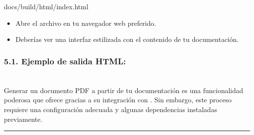 \documentclass[a4paper,10pt,oneside,spanish,openany]{sphinxmanual}
\begin{document}
\begin{sphinxVerbatim}[commandchars=\\\{\}]
docs/build/html/index.html
\end{sphinxVerbatim}
\begin{itemize}
\item {} 
\sphinxAtStartPar
Abre el archivo  en tu navegador web preferido.

\item {} 
\sphinxAtStartPar
Deberías ver una interfaz estilizada con el contenido de tu documentación.

\end{itemize}


\subsubsection{5.1. Ejemplo de salida HTML:}
\label{\detokenize{configuracion_inicial/008.Generar_HTML:ejemplo-de-salida-html}}
\sphinxAtStartPar
{}

\sphinxstepscope


\section{}
\label{\detokenize{configuracion_inicial/009.Generar_PDF:generacion-de-pdf-a-partir-de-la-documentacion}}\label{\detokenize{configuracion_inicial/009.Generar_PDF::doc}}
\sphinxAtStartPar
Generar un documento PDF a partir de tu documentación es una funcionalidad poderosa que ofrece  gracias a su integración con . Sin embargo, este proceso requiere una configuración adecuada y algunas dependencias instaladas previamente.


\bigskip\hrule\bigskip
\end{document}
